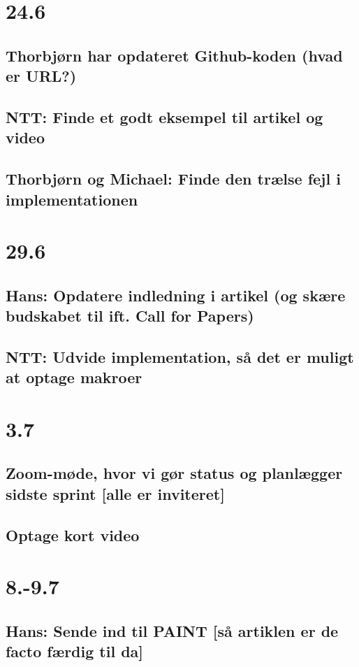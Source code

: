 \documentclass[11pt]{article}
\begin{document}
\section{24.6}
\label{sec-9}

\subsection{Thorbjørn har opdateret Github-koden (hvad er URL?)}
\label{sec-9-1}
\subsection{NTT: Finde et godt eksempel til artikel og video}
\label{sec-9-2}
\subsection{Thorbjørn og Michael: Finde den trælse fejl i implementationen}
\label{sec-9-3}

\section{29.6}
\label{sec-10}

\subsection{Hans: Opdatere indledning i artikel (og skære budskabet til ift. Call for Papers)}
\label{sec-10-1}
\subsection{NTT: Udvide implementation, så det er muligt at optage makroer}
\label{sec-10-2}

\section{3.7}
\label{sec-11}

\subsection{Zoom-møde, hvor vi gør status og planlægger sidste sprint [alle er inviteret]}
\label{sec-11-1}
\subsection{Optage kort video}
\label{sec-11-2}

\section{8.-9.7}
\label{sec-12}

\subsection{Hans: Sende ind til PAINT [så artiklen er de facto færdig til da]}
\label{sec-12-1}
\end{document}
